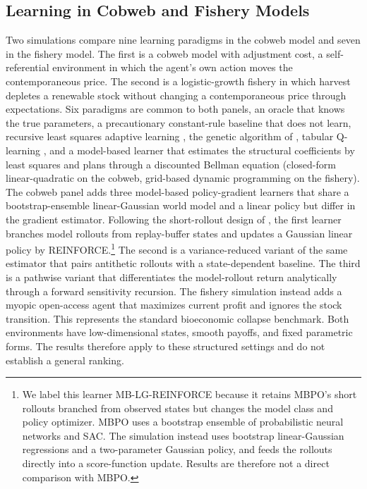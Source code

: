 \subsection{Learning in Cobweb and Fishery Models}
\label{section:fc_dual_sim}

Two simulations compare nine learning paradigms in the cobweb model and seven in the fishery model.
The first is a cobweb model with adjustment cost, a self-referential environment in which the agent's own action moves the contemporaneous price.
The second is a logistic-growth fishery in which harvest depletes a renewable stock without changing a contemporaneous price through expectations.
Six paradigms are common to both panels, an oracle that knows the true parameters, a precautionary constant-rule baseline that does not learn, recursive least squares adaptive learning \citep{MarcetSargent1989}, the genetic algorithm of \citet{Arifovic1994}, tabular Q-learning \citep{WatkinsDayan1992}, and a model-based learner that estimates the structural coefficients by least squares and plans through a discounted Bellman equation (closed-form linear-quadratic on the cobweb, grid-based dynamic programming on the fishery).
The cobweb panel adds three model-based policy-gradient learners that share a bootstrap-ensemble linear-Gaussian world model and a linear policy but differ in the gradient estimator.
Following the short-rollout design of \citet{janner2019model}, the first learner branches model rollouts from replay-buffer states and updates a Gaussian linear policy by REINFORCE.\footnote{We label this learner MB-LG-REINFORCE because it retains MBPO's short rollouts branched from observed states but changes the model class and policy optimizer. MBPO uses a bootstrap ensemble of probabilistic neural networks and SAC. The simulation instead uses bootstrap linear-Gaussian regressions and a two-parameter Gaussian policy, and feeds the rollouts directly into a score-function update. Results are therefore not a direct comparison with MBPO.}
The second is a variance-reduced variant of the same estimator that pairs antithetic rollouts with a state-dependent baseline.
The third is a pathwise variant that differentiates the model-rollout return analytically through a forward sensitivity recursion.
The fishery simulation instead adds a myopic open-access agent that maximizes current profit and ignores the stock transition. This represents the standard bioeconomic collapse benchmark.
Both environments have low-dimensional states, smooth payoffs, and fixed parametric forms. The results therefore apply to these structured settings and do not establish a general ranking.

